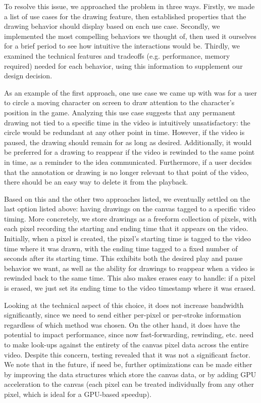 \documentclass[conference]{IEEEtran}
\begin{document}
  To resolve this issue, we approached the problem in three ways. Firstly, we made a list of use cases for the drawing feature, then established properties that the drawing behavior should display based on each use case. Secondly, we implemented the most compelling behaviors we thought of, then used it ourselves for a brief period to see how intuitive the interactions would be. Thirdly, we examined the technical features and tradeoffs (e.g. performance, memory required) needed for each behavior, using this information to supplement our design decision.

  As an example of the first approach, one use case we came up with was for a user to circle a moving character on screen to draw attention to the character's position in the game. Analyzing this use case suggests that any permanent drawing not tied to a specific time in the video is intuitively unsatisfactory: the circle would be redundant at any other point in time. However, if the video is paused, the drawing should remain for as long as desired. Additionally, it would be preferred for a drawing to reappear if the video is rewinded to the same point in time, as a reminder to the idea communicated. Furthermore, if a user decides that the annotation or drawing is no longer relevant to that point of the video, there should be an easy way to delete it from the playback.

  Based on this and the other two approaches listed, we eventually settled on the last option listed above: having drawings on the canvas tagged to a specific video timing. More concretely, we store drawings as a freeform collection of pixels, with each pixel recording the starting and ending time that it appears on the video. Initially, when a pixel is created, the pixel's starting time is tagged to the video time where it was drawn, with the ending time tagged to a fixed number of seconds after its starting time. This exhibits both the desired play and pause behavior we want, as well as the ability for drawings to reappear when a video is rewinded back to the same time. This also makes erases easy to handle: if a pixel is erased, we just set its ending time to the video timestamp where it was erased.

  Looking at the technical aspect of this choice, it does not increase bandwidth significantly, since we need to send either per-pixel or per-stroke information regardless of which method was chosen. On the other hand, it does have the potential to impact performance, since now fast-forwarding, rewinding, etc. need to make look-ups against the entirety of the canvas pixel data across the entire video. Despite this concern, testing revealed that it was not a significant factor. We note that in the future, if need be, further optimizations can be made either by improving the data structures which store the canvas data, or by adding GPU acceleration to the canvas (each pixel can be treated individually from any other pixel, which is ideal for a GPU-based speedup).
\end{document}
